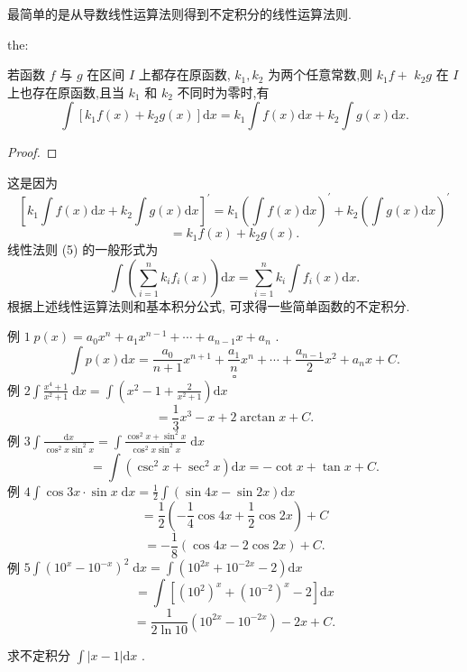 最简单的是从导数线性运算法则得到不定积分的线性运算法则.

\begin{theorem}{}{the:}

\end{theorem}
 若函数 \(f\) 与 \(g\) 在区间 \(I\) 上都存在原函数, \({k}_{1},{k}_{2}\) 为两个任意常数,则 \({k}_{1}f +\)  \({k}_{2}g\) 在 \(I\) 上也存在原函数,且当 \({k}_{1}\) 和 \({k}_{2}\) 不同时为零时,有
\[
\int \left\lbrack  {{k}_{1}f\left( x\right)  + {k}_{2}g\left( x\right) }\right\rbrack  \mathrm{d}x = {k}_{1}\int f\left( x\right) \mathrm{d}x + {k}_{2}\int g\left( x\right) \mathrm{d}x. \tag{5}
\]
\begin{proof}

\end{proof}
这是因为
\[
{\left\lbrack  {k}_{1}\int f\left( x\right) \mathrm{d}x + {k}_{2}\int g\left( x\right) \mathrm{d}x\right\rbrack  }^{\prime } = {k}_{1}{\left( \int f\left( x\right) \mathrm{d}x\right) }^{\prime } + {k}_{2}{\left( \int g\left( x\right) \mathrm{d}x\right) }^{\prime }
\]
\[
= {k}_{1}f\left( x\right)  + {k}_{2}g\left( x\right) .
\]
线性法则 (5) 的一般形式为
\[
\int \left( {\mathop{\sum }\limits_{{i = 1}}^{n}{k}_{i}{f}_{i}\left( x\right) }\right) \mathrm{d}x = \mathop{\sum }\limits_{{i = 1}}^{n}{k}_{i}\int {f}_{i}\left( x\right) \mathrm{d}x. \tag{6}
\]
根据上述线性运算法则和基本积分公式, 可求得一些简单函数的不定积分.

例 \(1\;p\left( x\right)  = {a}_{0}{x}^{n} + {a}_{1}{x}^{n - 1} + \cdots  + {a}_{n - 1}x + {a}_{n}\) .
\[
\int p\left( x\right) \mathrm{d}x = \frac{{a}_{0}}{n + 1}{x}^{n + 1} + \frac{{a}_{1}}{n}{x}^{n} + \cdots  + \frac{{a}_{n - 1}}{2}{x}^{2} + {a}_{n}x + C.
\]
\[
\square
\]
例 \(2\int \frac{{x}^{4} + 1}{{x}^{2} + 1}\mathrm{\;d}x = \int \left( {{x}^{2} - 1 + \frac{2}{{x}^{2} + 1}}\right) \mathrm{d}x\)
\[
= \frac{1}{3}{x}^{3} - x + 2\arctan x + C.
\]
例 \(3\int \frac{\mathrm{d}x}{{\cos }^{2}x{\sin }^{2}x} = \int \frac{{\cos }^{2}x + {\sin }^{2}x}{{\cos }^{2}x{\sin }^{2}x}\mathrm{\;d}x\)
\[
= \int \left( {{\csc }^{2}x + {\sec }^{2}x}\right) \mathrm{d}x =  - \cot x + \tan x + C.
\]
例 \(4\int \cos {3x} \cdot  \sin x\mathrm{\;d}x = \frac{1}{2}\int \left( {\sin {4x} - \sin {2x}}\right) \mathrm{d}x\)
\[
= \frac{1}{2}\left( {-\frac{1}{4}\cos {4x} + \frac{1}{2}\cos {2x}}\right)  + C
\]
\[
=  - \frac{1}{8}\left( {\cos {4x} - 2\cos {2x}}\right)  + C.
\]
例 \(5\int {\left( {10}^{x} - {10}^{-x}\right) }^{2}\mathrm{\;d}x = \int \left( {{10}^{2x} + {10}^{-{2x}} - 2}\right) \mathrm{d}x\)
\[
= \int \left\lbrack  {{\left( {10}^{2}\right) }^{x} + {\left( {10}^{-2}\right) }^{x} - 2}\right\rbrack  \mathrm{d}x
\]
\[
= \frac{1}{2\ln {10}}\left( {{10}^{2x} - {10}^{-{2x}}}\right)  - {2x} + C.
\]
\begin{example}

\end{example}
求不定积分 \(\int \left| {x - 1}\right| \mathrm{d}x\) .

